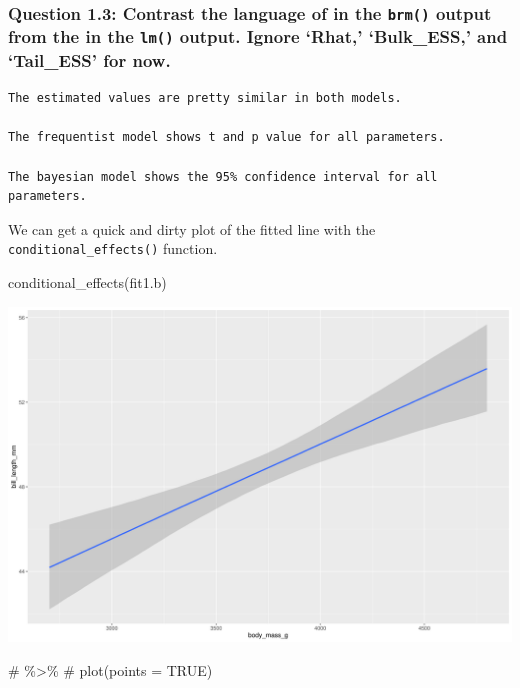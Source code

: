 \documentclass[
  letterpaper,
  DIV=11,
  numbers=noendperiod]{scrartcl}
\newenvironment{Shaded}{\begin{snugshade}}{\end{snugshade}}
\newcommand{\CommentTok}[1]{\textcolor[rgb]{0.37,0.37,0.37}{#1}}
\newcommand{\FunctionTok}[1]{\textcolor[rgb]{0.28,0.35,0.67}{#1}}
\newcommand{\NormalTok}[1]{\textcolor[rgb]{0.00,0.23,0.31}{#1}}
\begin{document}
\subsubsection{\texorpdfstring{Question 1.3: Contrast the language of in
the \texttt{brm()} output from the in the \texttt{lm()} output. Ignore
`Rhat,' `Bulk\_ESS,' and `Tail\_ESS' for
now.}{Question 1.3: Contrast the language of in the brm() output from the in the lm() output. Ignore `Rhat,' `Bulk\_ESS,' and `Tail\_ESS' for now.}}\label{question-1.3-contrast-the-language-of-in-the-brm-output-from-the-in-the-lm-output.-ignore-rhat-bulk_ess-and-tail_ess-for-now.}

\begin{verbatim}
The estimated values are pretty similar in both models. 

The frequentist model shows t and p value for all parameters.

The bayesian model shows the 95% confidence interval for all parameters.
\end{verbatim}

We can get a quick and dirty plot of the fitted line with the
\texttt{conditional\_effects()} function.

\begin{Shaded}
\begin{Highlighting}[]
\FunctionTok{conditional\_effects}\NormalTok{(fit1.b)}
\end{Highlighting}
\end{Shaded}

\includegraphics{Bayes_Lab_1_files/figure-pdf/unnamed-chunk-21-1.pdf}

\begin{Shaded}
\begin{Highlighting}[]
\CommentTok{\# \%\textgreater{}\% }
\CommentTok{\#   plot(points = TRUE)}
\end{Highlighting}
\end{Shaded}
\end{document}
